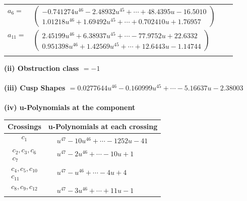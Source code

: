 \documentclass[1p]{elsarticle_modified}
\theoremstyle{definition}
\begin{document}
\begin{tabular}{m{7pt} m{180pt} m{7pt} m{180pt} }
\flushright $a_{6}=$&$\begin{pmatrix}-0.741274 u^{46}-2.48932 u^{45}+\cdots+48.4395 u-16.5010\\1.01218 u^{46}+1.69492 u^{45}+\cdots+0.702410 u+1.76957\end{pmatrix}$ \\
\flushright $a_{11}=$&$\begin{pmatrix}2.45199 u^{46}+6.38937 u^{45}+\cdots-77.9752 u+22.6332\\0.951398 u^{46}+1.42569 u^{45}+\cdots+12.6443 u-1.14744\end{pmatrix}$\\&\end{tabular}
\flushleft \textbf{(ii) Obstruction class $= -1$}\\~\\
\flushleft \textbf{(iii) Cusp Shapes $= 0.0277644 u^{46}-0.160999 u^{45}+\cdots-5.16637 u-2.38003$}\\~\\
\newpage\renewcommand{\arraystretch}{1}
\flushleft \textbf{(iv) u-Polynomials at the component}\newline \\
\begin{tabular}{m{50pt}|m{274pt}}
Crossings & \hspace{64pt}u-Polynomials at each crossing \\
\hline $$\begin{aligned}c_{1}\end{aligned}$$&$\begin{aligned}
&u^{47}-10 u^{46}+\cdots-1252 u-41
\end{aligned}$\\
\hline $$\begin{aligned}c_{2},c_{3},c_{6}\\c_{7}\end{aligned}$$&$\begin{aligned}
&u^{47}-2 u^{46}+\cdots-10 u+1
\end{aligned}$\\
\hline $$\begin{aligned}c_{4},c_{5},c_{10}\\c_{11}\end{aligned}$$&$\begin{aligned}
&u^{47}- u^{46}+\cdots-4 u+4
\end{aligned}$\\
\hline $$\begin{aligned}c_{8},c_{9},c_{12}\end{aligned}$$&$\begin{aligned}
&u^{47}-3 u^{46}+\cdots+11 u-1
\end{aligned}$\\
\hline
\end{tabular}\\~\\
\end{document}

